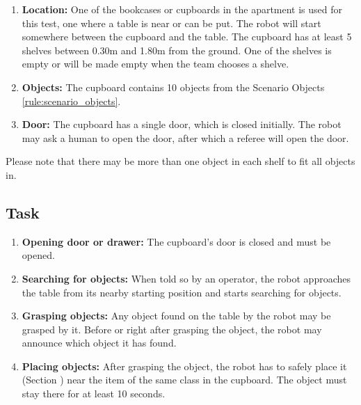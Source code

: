 \begin{enumerate}
\item \textbf{Location:} One of the bookcases or cupboards in the apartment is used for this test, one where a table is near or can be put. 
The robot will start somewhere between the cupboard and the table. 
The cupboard has at least 5 shelves between 0.30m and 1.80m from the ground. 
One of the shelves is empty or will be made empty when the team chooses a shelve.
\item \textbf{Objects:} The cupboard contains 10 objects from the Scenario Objects \ref{rule:scenario_objects}.
\item \textbf{Door:} The cupboard has a single door, which is closed initially.
The robot may ask a human to open the door, after which a referee will open the door. 
\end{enumerate}

Please note that there may be more than one object in each shelf to fit all objects in.

\subsection{Task}
\begin{enumerate}
\item \textbf{Opening door or drawer:} The cupboard's door is closed and must be opened.
\item \textbf{Searching for objects:} When told so by an operator, the robot approaches the table from its nearby starting position and starts searching for objects. 
\item \textbf{Grasping objects:} Any object found on the table by the robot may be grasped by it. 
  Before or right after grasping the object, the robot may announce which object it has found. 
\item \textbf{Placing objects:} After grasping the object, the robot has to safely place it (Section ) near the item of the same class in the cupboard. 
  The object must stay there for at least 10 seconds.
\end{enumerate}

